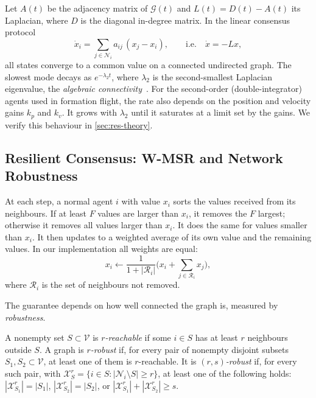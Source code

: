 Let $A(t)$ be the adjacency matrix of $\mathcal{G}(t)$ and $L(t)=D(t)-A(t)$ its Laplacian, where $D$ is the diagonal
in-degree matrix. In the linear consensus protocol
\begin{equation}
    \dot x_i = \sum_{j\in\mathcal{N}_i} a_{ij}\,(x_j - x_i), \qquad \text{i.e.}\quad \dot x = -L x ,
    \label{eq:consensus}
\end{equation}
all states converge to a common value on a connected undirected graph. The slowest mode decays as
$e^{-\lambda_2 t}$, where $\lambda_2$ is the second-smallest Laplacian eigenvalue, the \emph{algebraic
connectivity}~\citep{Fiedler1973}. For the second-order (double-integrator) agents used in formation flight, the rate
also depends on the position and velocity gains $k_p$ and $k_v$. It grows with $\lambda_2$ until it saturates at a
limit set by the gains. We verify this behaviour in \autoref{sec:res-theory}.

\subsection{Resilient Consensus: W-MSR and Network Robustness}
\label{sec:wmsr}

\begin{definition}
At each step, a normal agent $i$ with value $x_i$ sorts the values received from its neighbours. If at least $F$
values are larger than $x_i$, it removes the $F$ largest; otherwise it removes all values larger than $x_i$. It
does the same for values smaller than $x_i$. It then updates to a weighted average of its own value and the
remaining values. In our implementation all weights are equal:
\begin{equation}
    x_i \leftarrow \frac{1}{1+|\mathcal{R}_i|}\Big(x_i + \sum_{j\in\mathcal{R}_i} x_j\Big),
    \label{eq:wmsr}
\end{equation}
where $\mathcal{R}_i$ is the set of neighbours not removed.
\end{definition}

The guarantee depends on how well connected the graph is, measured by \emph{robustness}.

\begin{definition}
A nonempty set $S\subset\mathcal{V}$ is \emph{$r$-reachable} if some $i\in S$ has at least $r$ neighbours outside $S$.
A graph is \emph{$r$-robust} if, for every pair of nonempty disjoint subsets $S_1,S_2\subset\mathcal{V}$, at least
one of them is $r$-reachable. It is \emph{$(r,s)$-robust} if, for every such pair, with
$\mathcal{X}^r_{S}=\{i\in S : |\mathcal{N}_i\setminus S|\ge r\}$, at least one of the following holds:
$|\mathcal{X}^r_{S_1}|=|S_1|$, $|\mathcal{X}^r_{S_2}|=|S_2|$, or $|\mathcal{X}^r_{S_1}|+|\mathcal{X}^r_{S_2}|\ge s$.
\end{definition}

